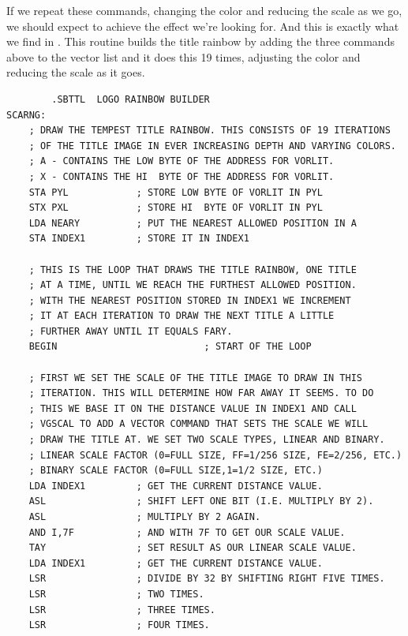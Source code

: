 If we repeat these commands, changing the color and reducing the scale as we go, we 
should expect to achieve the effect we're looking for. And this is exactly what we find
in . This routine builds the title rainbow by adding the three commands above
to the vector list and it does this 19 times, adjusting the color and reducing the scale
as it goes.
\begin{lstlisting}
        .SBTTL  LOGO RAINBOW BUILDER
SCARNG:
    ; DRAW THE TEMPEST TITLE RAINBOW. THIS CONSISTS OF 19 ITERATIONS
    ; OF THE TITLE IMAGE IN EVER INCREASING DEPTH AND VARYING COLORS.
    ; A - CONTAINS THE LOW BYTE OF THE ADDRESS FOR VORLIT.
    ; X - CONTAINS THE HI  BYTE OF THE ADDRESS FOR VORLIT.
    STA PYL            ; STORE LOW BYTE OF VORLIT IN PYL
    STX PXL            ; STORE HI  BYTE OF VORLIT IN PYL
    LDA NEARY          ; PUT THE NEAREST ALLOWED POSITION IN A
    STA INDEX1         ; STORE IT IN INDEX1
    
    ; THIS IS THE LOOP THAT DRAWS THE TITLE RAINBOW, ONE TITLE
    ; AT A TIME, UNTIL WE REACH THE FURTHEST ALLOWED POSITION.
    ; WITH THE NEAREST POSITION STORED IN INDEX1 WE INCREMENT
    ; IT AT EACH ITERATION TO DRAW THE NEXT TITLE A LITTLE
    ; FURTHER AWAY UNTIL IT EQUALS FARY.
    BEGIN                          ; START OF THE LOOP
    
    ; FIRST WE SET THE SCALE OF THE TITLE IMAGE TO DRAW IN THIS
    ; ITERATION. THIS WILL DETERMINE HOW FAR AWAY IT SEEMS. TO DO
    ; THIS WE BASE IT ON THE DISTANCE VALUE IN INDEX1 AND CALL
    ; VGSCAL TO ADD A VECTOR COMMAND THAT SETS THE SCALE WE WILL
    ; DRAW THE TITLE AT. WE SET TWO SCALE TYPES, LINEAR AND BINARY.
    ; LINEAR SCALE FACTOR (0=FULL SIZE, FF=1/256 SIZE, FE=2/256, ETC.)
    ; BINARY SCALE FACTOR (0=FULL SIZE,1=1/2 SIZE, ETC.)
    LDA INDEX1         ; GET THE CURRENT DISTANCE VALUE.
    ASL                ; SHIFT LEFT ONE BIT (I.E. MULTIPLY BY 2).
    ASL                ; MULTIPLY BY 2 AGAIN.
    AND I,7F           ; AND WITH 7F TO GET OUR SCALE VALUE.
    TAY                ; SET RESULT AS OUR LINEAR SCALE VALUE.
    LDA INDEX1         ; GET THE CURRENT DISTANCE VALUE.
    LSR                ; DIVIDE BY 32 BY SHIFTING RIGHT FIVE TIMES.
    LSR                ; TWO TIMES.
    LSR                ; THREE TIMES.
    LSR                ; FOUR TIMES.
\end{lstlisting}
